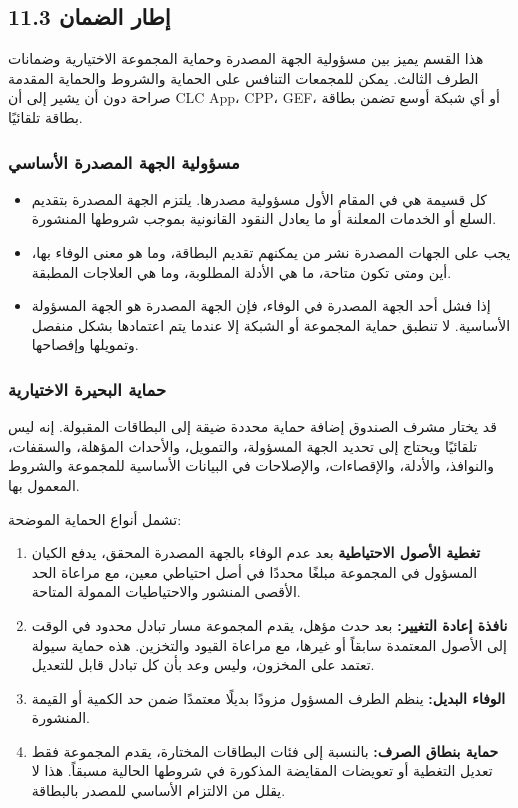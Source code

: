 \documentclass[11pt]{article}
\begin{document}
\subsection*{11.3 إطار الضمان}

هذا القسم يميز بين مسؤولية الجهة المصدرة وحماية المجموعة الاختيارية وضمانات الطرف الثالث. يمكن للمجمعات التنافس على الحماية والشروط والحماية المقدمة صراحة دون أن يشير إلى أن CLC App، CPP، GEF، أو أي شبكة أوسع تضمن بطاقة بطاقة تلقائيًا.

\subsubsection*{مسؤولية الجهة المصدرة الأساسي}

\begin{itemize}[leftmargin=*]
\item كل قسيمة هي في المقام الأول مسؤولية مصدرها. يلتزم الجهة المصدرة بتقديم السلع أو الخدمات المعلنة أو ما يعادل النقود القانونية بموجب شروطها المنشورة.
\item يجب على الجهات المصدرة نشر من يمكنهم تقديم البطاقة، وما هو معنى الوفاء بها، أين ومتى تكون متاحة، ما هي الأدلة المطلوبة، وما هي العلاجات المطبقة.
\item إذا فشل أحد الجهة المصدرة في الوفاء، فإن الجهة المصدرة هو الجهة المسؤولة الأساسية. لا تنطبق حماية المجموعة أو الشبكة إلا عندما يتم اعتمادها بشكل منفصل وتمويلها وإفصاحها.
\end{itemize}
\subsubsection*{حماية البحيرة الاختيارية}

قد يختار مشرف الصندوق إضافة حماية محددة ضيقة إلى البطاقات المقبولة. إنه ليس تلقائيًا ويحتاج إلى تحديد الجهة المسؤولة، والتمويل، والأحداث المؤهلة، والسقفات، والنوافذ، والأدلة، والإقصاءات، والإصلاحات في البيانات الأساسية للمجموعة والشروط المعمول بها.

تشمل أنواع الحماية الموضحة:

\begin{enumerate}[leftmargin=*]
\item \textbf{تغطية الأصول الاحتياطية} بعد عدم الوفاء بالجهة المصدرة المحقق، يدفع الكيان المسؤول في المجموعة مبلغًا محددًا في أصل احتياطي معين، مع مراعاة الحد الأقصى المنشور والاحتياطيات الممولة المتاحة.
\item \textbf{نافذة إعادة التغيير:} بعد حدث مؤهل، يقدم المجموعة مسار تبادل محدود في الوقت إلى الأصول المعتمدة سابقاً أو غيرها، مع مراعاة القيود والتخزين. هذه حماية سيولة تعتمد على المخزون، وليس وعد بأن كل تبادل قابل للتعديل.
\item \textbf{الوفاء البديل:} ينظم الطرف المسؤول مزودًا بديلًا معتمدًا ضمن حد الكمية أو القيمة المنشورة.
\item \textbf{حماية بنطاق الصرف:} بالنسبة إلى فئات البطاقات المختارة، يقدم المجموعة فقط تعديل التغطية أو تعويضات المقايضة المذكورة في شروطها الحالية مسبقاً. هذا لا يقلل من الالتزام الأساسي للمصدر بالبطاقة.
\end{enumerate}
\end{document}
